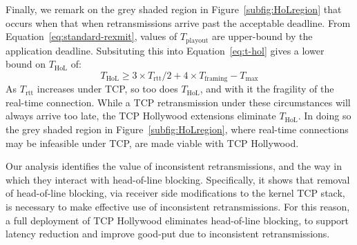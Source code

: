 %
%

Finally, we remark on the grey shaded region in Figure~\ref{subfig:HoLregion}
that occurs  when that when retransmissions arrive past the acceptable deadline.
From Equation~\ref{eq:standard-rexmit}, values of $T_\mathrm{playout}$ are
upper-bound by the application deadline. Subsituting this into
Equation~\ref{eq:t-hol} gives a lower bound on $T_\mathrm{HoL}$ of:
\begin{equation}
  T_\mathrm{HoL} \geq 3 \times T_\mathrm{rtt}/2 + 4 \times T_\mathrm{framing} - T_\mathrm{max}
\label{eq:hol-lower}
\end{equation}
As $T_\mathrm{rtt}$ increases under TCP, so too does $T_\mathrm{HoL}$, and with
it the fragility of the real-time connection. While a TCP retransmission under
these circumstances will always arrive too late, the TCP Hollywood extensions eliminate
$T_\mathrm{HoL}$. In doing so the grey shaded region in
Figure~\ref{subfig:HoLregion}, where real-time connections may be infeasible
under TCP, are made viable with TCP Hollywood.

Our analysis identifies the value of inconsistent retransmissions, and the
way in which they interact with head-of-line blocking. Specifically, it
shows that removal of head-of-line blocking, via receiver side
modifications to the kernel TCP stack, is necessary to make effective use
of inconsistent retransmissions.  For this reason, a full deployment of
TCP Hollywood eliminates head-of-line blocking, to support latency
reduction and improve good-put due to inconsistent retransmissions.
